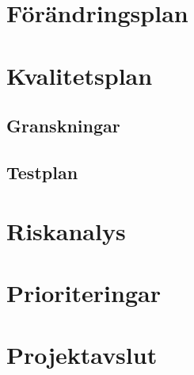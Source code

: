 \documentclass{article}
\begin{document}
\section{Förändringsplan}
\section{Kvalitetsplan}

\subsection{Granskningar}
\subsection{Testplan}

\section{Riskanalys}
\section{Prioriteringar}
\section{Projektavslut}
\end{document}
